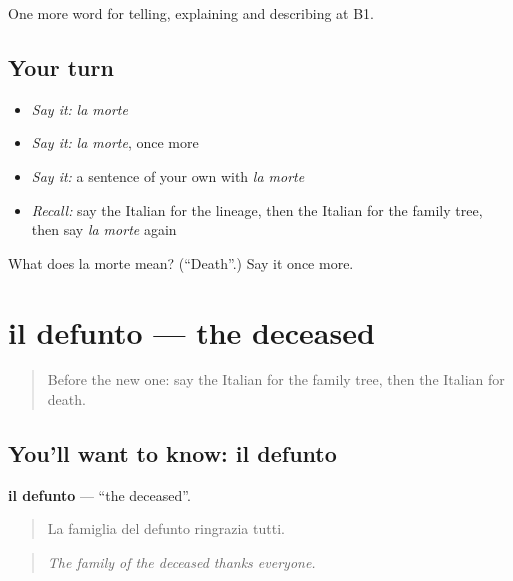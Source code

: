 \begin{grammarlens}[title={What you've built}]
One more word for telling, explaining and describing at B1.
\end{grammarlens}

\subsection*{Your turn}
\begin{itemize}
\raggedright
  \item \emph{Say it:} \emph{la morte}
  \item \emph{Say it:} \emph{la morte}, once more
  \item \emph{Say it:} a sentence of your own with \emph{la morte}
  \item \emph{Recall:} say the Italian for the lineage, then the Italian for the family tree, then say \emph{la morte} again
\end{itemize}

\begin{tcolorbox}[breakable,colback=teal!4,colframe=teal!35!black,title={Before you move on}]
What does la morte mean? (\textquotedblleft{}Death\textquotedblright{}.) Say it once more.
\end{tcolorbox}
\section[il defunto]{il defunto — the deceased}

\label{lesson:IT-C313-defunto}



\begin{quote}
Before the new one: say the Italian for the family tree, then the Italian for death.
\end{quote}

\subsection*{You'll want to know: il defunto}
\textbf{il defunto} — \textquotedblleft{}the deceased\textquotedblright{}.

\begin{quote}
La famiglia del defunto ringrazia tutti.
\end{quote}

\begin{quote}
\emph{The family of the deceased thanks everyone.}
\end{quote}

